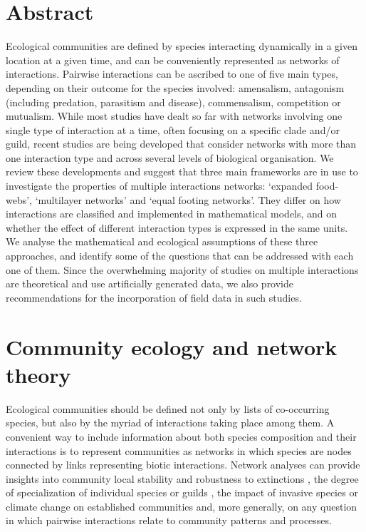 \section*{Abstract}
Ecological communities are defined by species interacting dynamically in a given location at a given time, and can be conveniently represented as networks of interactions. Pairwise interactions can be ascribed to one of five main types, depending on their outcome for the species involved: amensalism, antagonism (including predation, parasitism and
disease), commensalism, competition or mutualism. While most studies have dealt so far with networks involving one single type of interaction at a time, often focusing on a specific clade and/or guild, recent studies are being developed that consider networks with more than one interaction type and across several levels of biological organisation. We review these developments and suggest that three main frameworks are in use to investigate the properties of multiple interactions networks: ‘expanded food-webs’, ‘multilayer networks’ and ‘equal footing networks’. They differ on how interactions are classified and implemented in mathematical models, and on whether the effect of different interaction types is expressed in the same units. We analyse the mathematical and ecological assumptions of these three approaches, and identify some of the questions that can be addressed with each one of them. Since the overwhelming majority of studies on multiple interactions are theoretical and use artificially generated data, we also provide recommendations for the incorporation of field data in such studies.

\section{Community ecology and network theory}
Ecological communities should be defined not only by lists of co-occurring species, but also by the myriad of interactions taking place among them. A convenient way to include information about both species composition and their interactions is to represent communities as networks in which species are nodes connected by links representing biotic interactions. Network analyses can provide insights into community local stability \citep{Allesina2012} and robustness to extinctions \citep{Riede2011a}, the degree of specialization of individual species or guilds \citep{Dorado2011}, the impact of invasive species or climate change on established communities \citep{Lopezaraiza-Mikel2007} and, more generally, on any question in which pairwise interactions relate to community patterns and processes.

